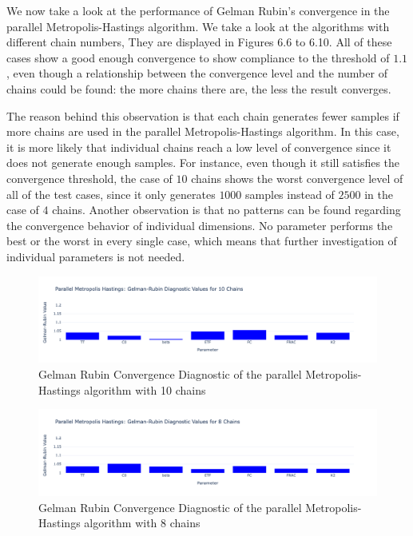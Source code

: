 We now take a look at the performance of Gelman Rubin's convergence in the parallel Metropolis-Hastings algorithm. We take a look at the algorithms with different chain numbers, They are displayed in Figures 6.6 to 6.10. All of these cases show a good enough convergence to show compliance to the threshold of $1.1$, even though a relationship between the convergence level and the number of chains could be found: the more chains there are, the less the result converges.

The reason behind this observation is that each chain generates fewer samples if more chains are used in the parallel Metropolis-Hastings algorithm. In this case, it is more likely that individual chains reach a low level of convergence since it does not generate enough samples. For instance, even though it still satisfies the convergence threshold, the case of $10$ chains shows the worst convergence level of all of the test cases, since it only generates $1000$ samples instead of $2500$ in the case of $4$ chains. Another observation is that no patterns can be found regarding the convergence behavior of individual dimensions. No parameter performs the best or the worst in every single case, which means that further investigation of individual parameters is not needed.

\begin{figure}[H]
    \centering
    \includegraphics[width=1\textwidth]{figures/parallel_mh/GR_10.png}
    \captionsetup{width=.8\textwidth}
    \caption{Gelman Rubin Convergence Diagnostic of the parallel Metropolis-Hastings algorithm with 10 chains}
    \label{fig:enter-label}
\end{figure}

\begin{figure}[H]
    \centering
    \includegraphics[width=1\textwidth]{figures/parallel_mh/GR_8.png}
    \captionsetup{width=.8\textwidth}
    \caption{Gelman Rubin Convergence Diagnostic of the parallel Metropolis-Hastings algorithm with 8 chains}
    \label{fig:enter-label}
\end{figure}

